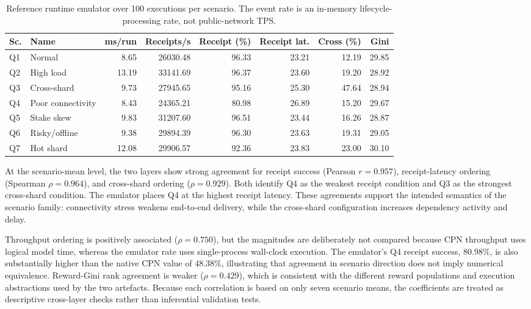 \documentclass[a4paper,fleqn]{cas-sc}
\begin{document}
\begin{table}[pos=t]
\centering
\caption{Reference runtime emulator over 100 executions per scenario. The event
rate is an in-memory lifecycle-processing rate, not public-network TPS.}
\label{tab:realtime}
\scriptsize
\setlength{\tabcolsep}{4.0pt}
\renewcommand{\arraystretch}{1.08}
\begin{tabular}{llrrrrrr}
\toprule
\textbf{Sc.} & \textbf{Name} & \textbf{ms/run} & \textbf{Receipts/s} &
\textbf{Receipt (\%)} & \textbf{Receipt lat.} & \textbf{Cross (\%)} & \textbf{Gini}\\
\midrule
Q1 & Normal & 8.65 & 26030.48 & 96.33 & 23.21 & 12.19 & 29.85\\
Q2 & High load & 13.19 & 33141.69 & 96.37 & 23.60 & 19.20 & 28.92\\
Q3 & Cross-shard & 9.73 & 27945.65 & 95.16 & 25.30 & 47.64 & 28.94\\
Q4 & Poor connectivity & 8.43 & 24365.21 & 80.98 & 26.89 & 15.20 & 29.67\\
Q5 & Stake skew & 9.83 & 31207.60 & 96.51 & 23.44 & 16.26 & 28.87\\
Q6 & Risky/offline & 9.38 & 29894.39 & 96.30 & 23.63 & 19.31 & 29.05\\
Q7 & Hot shard & 12.08 & 29906.57 & 92.36 & 23.83 & 23.00 & 30.10\\
\bottomrule
\end{tabular}
\end{table}

At the scenario-mean level, the two layers show strong agreement for receipt
success (Pearson $r=0.957$), receipt-latency ordering (Spearman
$\rho=0.964$), and cross-shard ordering ($\rho=0.929$). Both identify Q4 as
the weakest receipt condition and Q3 as the strongest cross-shard condition.
The emulator places Q4 at the highest receipt latency. These agreements
support the intended semantics of the scenario family: connectivity stress
weakens end-to-end delivery, while the cross-shard configuration increases
dependency activity and delay.

Throughput ordering is positively associated ($\rho=0.750$), but the magnitudes
are deliberately not compared because CPN throughput uses logical model time,
whereas the emulator rate uses single-process wall-clock execution. The
emulator's Q4 receipt success, 80.98\%, is also substantially higher than the
native CPN value of 48.38\%, illustrating that agreement in scenario direction
does not imply numerical equivalence. Reward-Gini rank agreement is weaker
($\rho=0.429$), which is consistent with the different reward
populations and execution abstractions used by the two artefacts. Because each
correlation is based on only seven scenario means, the coefficients are treated
as descriptive cross-layer checks rather than inferential validation tests.
\end{document}
